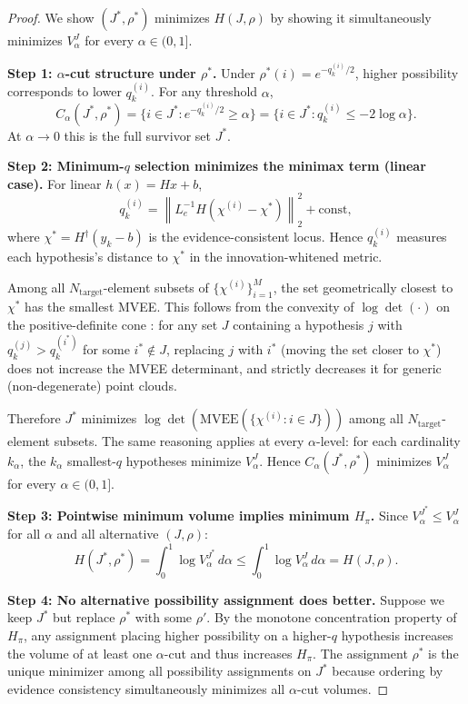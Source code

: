 \documentclass[12pt]{article}
\begin{document}
\begin{proof}
We show $(J^*,\rho^*)$ minimizes $H(J,\rho)$ by showing it simultaneously minimizes $V^J_\alpha$ for every $\alpha \in (0,1]$.

\textbf{Step 1: $\alpha$-cut structure under $\rho^*$.} Under $\rho^*(i) = e^{-q^{(i)}_k/2}$, higher possibility corresponds to lower $q^{(i)}_k$. For any threshold $\alpha$,
\[
C_\alpha(J^*,\rho^*) = \bigl\{i \in J^* : e^{-q^{(i)}_k/2} \geq \alpha\bigr\} = \bigl\{i \in J^* : q^{(i)}_k \leq -2\log\alpha\bigr\}.
\]
At $\alpha \to 0$ this is the full survivor set $J^*$.

\textbf{Step 2: Minimum-$q$ selection minimizes the minimax term (linear case).} For linear $h(x) = Hx + b$,
\[
q^{(i)}_k = \left\|L_e^{-1}H(\chi^{(i)} - \chi^*)\right\|_2^2 + \mathrm{const},
\]
where $\chi^* = H^\dagger(y_k - b)$ is the evidence-consistent locus. Hence $q^{(i)}_k$ measures each hypothesis's distance to $\chi^*$ in the innovation-whitened metric.

Among all $N_{\mathrm{target}}$-element subsets of $\{\chi^{(i)}\}^M_{i=1}$, the set geometrically closest to $\chi^*$ has the smallest MVEE. This follows from the convexity of $\log\det(\cdot)$ on the positive-definite cone \cite{todd}: for any set $J$ containing a hypothesis $j$ with $q^{(j)}_k > q^{(i^*)}_k$ for some $i^* \notin J$, replacing $j$ with $i^*$ (moving the set closer to $\chi^*$) does not increase the MVEE determinant, and strictly decreases it for generic (non-degenerate) point clouds.

Therefore $J^*$ minimizes $\log\det(\mathrm{MVEE}(\{\chi^{(i)} : i \in J\}))$ among all $N_{\mathrm{target}}$-element subsets. The same reasoning applies at every $\alpha$-level: for each cardinality $k_\alpha$, the $k_\alpha$ smallest-$q$ hypotheses minimize $V^J_\alpha$. Hence $C_\alpha(J^*,\rho^*)$ minimizes $V^J_\alpha$ for every $\alpha \in (0,1]$.

\textbf{Step 3: Pointwise minimum volume implies minimum $H_\pi$.} Since $V^{J^*}_\alpha \leq V^J_\alpha$ for all $\alpha$ and all alternative $(J,\rho)$:
\[
H(J^*,\rho^*) = \int_0^1 \log V^{J^*}_\alpha\,d\alpha \leq \int_0^1 \log V^J_\alpha\,d\alpha = H(J,\rho).
\]

\textbf{Step 4: No alternative possibility assignment does better.} Suppose we keep $J^*$ but replace $\rho^*$ with some $\rho'$. By the monotone concentration property of $H_\pi$, any assignment placing higher possibility on a higher-$q$ hypothesis increases the volume of at least one $\alpha$-cut and thus increases $H_\pi$. The assignment $\rho^*$ is the unique minimizer among all possibility assignments on $J^*$ because ordering by evidence consistency simultaneously minimizes all $\alpha$-cut volumes.


\end{proof}
\end{document}
